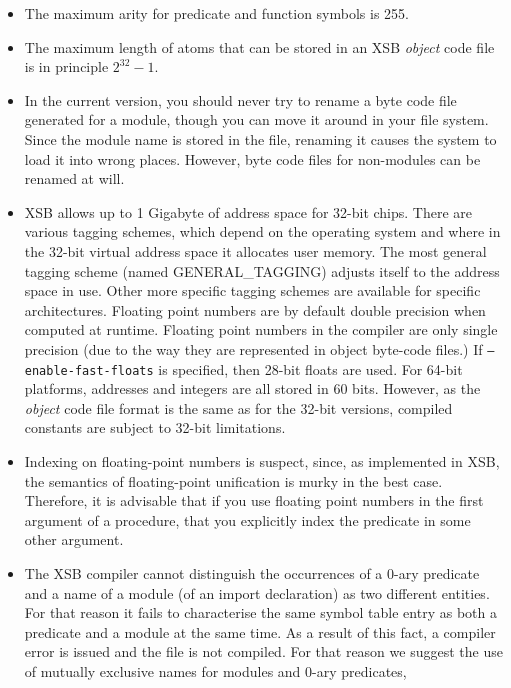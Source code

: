 \begin{itemize}
\item The maximum arity for predicate and function symbols is 255.
%
\item The maximum length of atoms that can be stored in an XSB
      \emph{object} code file is in principle $2^{32}-1$.
%
\item In the current version, you should never try to rename a byte code 
      file generated for a module, though you can move it around in your 
      file system.  Since the module name is stored in the file, renaming it
      causes the system to load it into wrong places.  However, byte code 
      files for non-modules can be renamed at will.
%
\item XSB allows up to 1 Gigabyte of address space for 32-bit chips.
      There are various tagging schemes, which depend on the operating
      system and where in the 32-bit virtual address space it
      allocates user memory.  The most general tagging scheme (named
      GENERAL\_TAGGING) adjusts itself to the address space in use.
      Other more specific tagging schemes are available for specific
      architectures.  Floating point numbers are by default double
      precision when computed at runtime.  Floating point numbers in
      the compiler are only single precision (due to the way they are
      represented in object byte-code files.)  If {\tt --enable-fast-floats}
      is specified, then 28-bit floats are used.  For 64-bit
      platforms, addresses and integers are all stored in 60 bits.
      However, as the \emph{object} code file format is the same as
      for the 32-bit versions, compiled constants are subject to
      32-bit limitations.
%
\item Indexing on floating-point numbers is suspect, since, as
      implemented in XSB, the semantics of floating-point unification
      is murky in the best case. Therefore, it is advisable that if
      you use floating point numbers in the first argument of a
      procedure, that you explicitly index the predicate in some other
      argument.
%
\item	The XSB compiler cannot distinguish the occurrences of a
      0-ary predicate and a name of a module (of an import declaration) as
      two different entities.  For that reason it fails to characterise the
      same symbol table entry as both a predicate and a module at the
      same time.  As a result of this fact, a compiler error is issued
      and the file is not compiled.  For that reason we suggest the
      use of mutually exclusive names for modules and 0-ary predicates,

\end{itemize}
